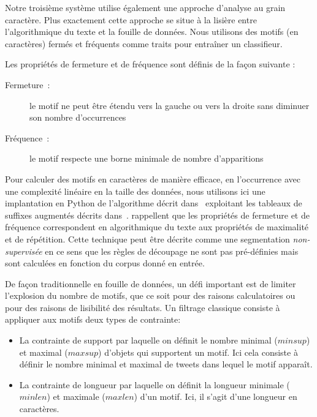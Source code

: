Notre troisième système utilise également une approche d'analyse au grain caractère.
Plus exactement cette approche se situe à la lisière entre l'algorithmique du texte et la fouille de données.
Nous utilisons des motifs (en caractères) fermés et fréquents comme traits pour entraîner un classifieur.

Les propriétés de fermeture et de fréquence sont définis de la façon suivante :%
\begin{description}
\item[Fermeture~:] le motif ne peut être étendu vers la gauche ou vers la droite sans diminuer son nombre d'occurrences
\item[Fréquence~:] le motif respecte une borne minimale de nombre d'apparitions
\end{description}

Pour calculer des motifs en caractères de manière efficace, en l'occurrence avec une complexité linéaire en la taille des données, nous utilisons ici une implantation en Python de l'algorithme décrit dans~\cite{Ukkonen-2009} exploitant les tableaux de suffixes augmentés décrits dans~\cite{Karkka-2006}.
\cite{Buscaldi-2017} rappellent que les propriétés de fermeture et de fréquence correspondent en algorithmique du texte aux propriétés de maximalité et de répétition.
Cette technique peut être décrite comme une segmentation \emph{non-supervisée} en ce sens que les règles de découpage ne sont pas pré-définies mais sont calculées en fonction du corpus donné en entrée. %

De façon traditionnelle en fouille de données, un défi important est de limiter l'explosion du nombre de motifs, que ce soit pour des raisons calculatoires ou pour des raisons de lisibilité des résultats.%
Un filtrage classique consiste à appliquer aux motifs deux types de contrainte:
\begin{itemize}
\item La contrainte de support par laquelle on définit le nombre minimal ($minsup$) et maximal ($maxsup$) d'objets qui supportent un motif.
  Ici cela consiste à définir le nombre minimal et maximal de tweets dans lequel le motif apparaît.
\item La contrainte de longueur par laquelle on définit la longueur minimale ($minlen$) et maximale ($maxlen$) d'un motif.
  Ici, il s'agit d'une longueur en caractères.
\end{itemize}

